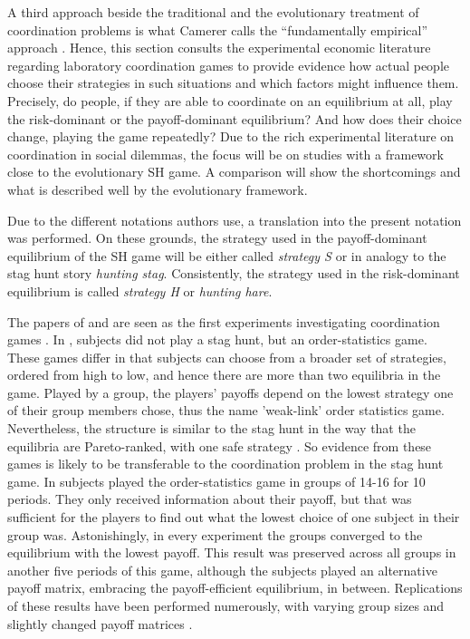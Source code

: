 \label{sec:experimentalevidence}
A third approach beside the traditional and the evolutionary treatment of 
coordination problems is what Camerer calls the 
``fundamentally empirical'' approach \parencite[336]{camerer_behavioral_2003}.
Hence, this section consults the experimental economic literature regarding 
laboratory coordination games to provide evidence how actual people choose
their strategies in such situations and which factors might influence them. 
Precisely, do people, if they are able to coordinate on an equilibrium at all,
play the risk-dominant or the payoff-dominant equilibrium? And how does their
choice change, playing the game repeatedly?
Due to the rich experimental literature on coordination in social 
dilemmas, the focus will be on studies with a framework close to the  
evolutionary SH game. A comparison will show the shortcomings and what
is described well by the evolutionary framework.

Due to the different notations authors use, a translation into the present
notation was performed.
On these grounds, the 
strategy used in the payoff-dominant equilibrium of the SH game will be 
either called  \textit{strategy S} or in analogy to the stag hunt story 
\textit{hunting stag}.
Consistently, the strategy used in the risk-dominant equilibrium is called
\textit{strategy H} or \textit{hunting hare}.

The papers of \textcite{van_huyck_tacit_1990} and 
\textcite{cooper_communication_1992} are seen as the first experiments 
investigating coordination games \parencite{devetag_when_2007}.
In \textcite{van_huyck_tacit_1990}, subjects did not play a stag
hunt, but an order-statistics game. These games differ in that subjects can
choose from a broader set of strategies, ordered from high to low, and 
hence there are more than two equilibria in the game. 
Played by a group, the players' payoffs depend on the lowest strategy one of 
their group members chose, thus the name 'weak-link' order statistics game. 
Nevertheless, the structure is similar to the stag hunt in the way 
that the equilibria are Pareto-ranked, with one 
safe strategy \parencite{devetag_when_2007}.
So evidence from these games is likely to be transferable to the 
coordination problem in the stag hunt game. 
In \textcite{van_huyck_tacit_1990} subjects played the order-statistics 
game in 
groups of 14-16 for 10 periods. They only received information about their 
payoff, but that was sufficient for the players to find out what the 
lowest choice of one subject in 
their group was. Astonishingly, in every experiment the groups converged
to the equilibrium with the lowest payoff. 
This result was preserved across all groups in another 
five periods of this game, although the subjects played an alternative payoff
matrix, embracing the payoff-efficient equilibrium, in between. 
Replications of these results have been performed numerously, with 
varying group sizes and slightly changed payoff matrices 
\parencite[6]{devetag_when_2007}.

